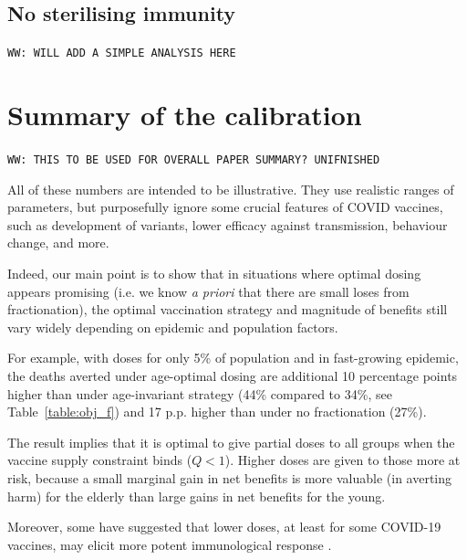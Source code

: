 \documentclass[12pt]{article}
\begin{document}
\subsection{No sterilising immunity}

{\tt WW: WILL ADD A SIMPLE ANALYSIS HERE}



\section{Summary of the calibration}

{\tt WW: THIS TO BE USED FOR OVERALL PAPER SUMMARY? UNIFNISHED}

All of these numbers are intended to be illustrative. They use realistic ranges of parameters, but purposefully ignore some crucial features of COVID vaccines, such as development of variants, lower efficacy against transmission, behaviour change, and more. 

Indeed, our main point is to show that in situations where optimal dosing appears promising (i.e. we know \textit{a priori} that there are small loses from fractionation), the optimal vaccination strategy and magnitude of benefits still vary widely depending on epidemic and population factors. 


For example, with doses for only 5\% of population and in fast-growing epidemic, the deaths averted under age-optimal dosing are additional 10 percentage points higher than under age-invariant strategy (44\% compared to 34\%, see Table~\ref{table:obj_f}) and 17 p.p. higher than under no fractionation (27\%). 


The result implies that it is optimal to give partial doses to all groups when the vaccine supply constraint binds ($Q<1$). Higher doses are given to those more at risk, because a small marginal gain in net benefits is more valuable (in averting harm) for the elderly than large gains in net benefits for the young. 

\pagebreak


Moreover, some have suggested that lower doses, at least for some COVID-19 vaccines, may elicit more potent immunological response \cite{sanchez_limiting_2021}.
\end{document}
